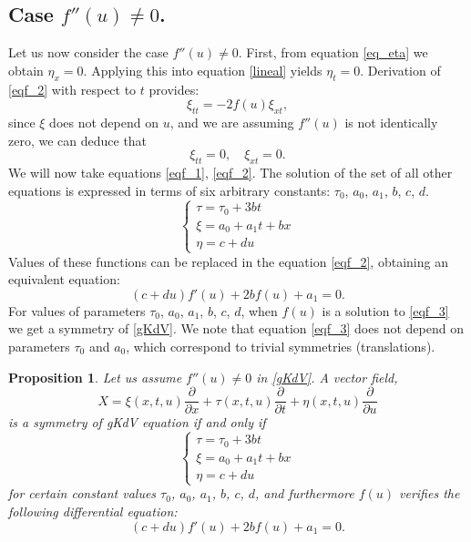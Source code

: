 \documentclass[
11pt,%
tightenlines,%
twoside,%
onecolumn,%
nofloats,%
nobibnotes,%
nofootinbib,%
superscriptaddress,%
noshowpacs,%
centertags]%
{revtex4}
\newtheorem{proposition}{Proposition}
\begin{document}
\subsection{Case $f''(u)\neq 0$.}

Let us now consider the case $f''(u) \neq 0$. First, from equation \eqref{eq_eta}
we obtain $\eta_x = 0$. Applying this into equation \eqref{lineal} yields $\eta_t = 0$. Derivation of \eqref{eqf_2} with respect to $t$ provides:
\begin{equation}
\xi_{tt} = -2f(u)\xi_{xt},
\end{equation}
since $\xi$ does not depend on $u$, and we are assuming $f''(u)$ is not identically zero, we can deduce that
\begin{equation}
\xi_{tt}= 0, \quad \xi_{xt} = 0.
\end{equation}
We will now take equations  \eqref{eqf_1}, \eqref{eqf_2}. The solution of the set of all other equations is expressed in terms of six arbitrary constants: $\tau_0$, $a_0$, $a_1$, $b$, $c$, $d$. 
\begin{equation}
\begin{cases}
\tau = \tau_0 + 3bt \\
\xi = a_0 + a_1t + bx \\
\eta = c + du
\end{cases}
\end{equation}
Values of these functions can be replaced in the equation  \eqref{eqf_2}, obtaining an equivalent equation:
\begin{equation}\label{eqf_3}
(c+du)f'(u) + 2bf(u) + a_1 = 0.
\end{equation}
For values of parameters $\tau_0$, $a_0$, $a_1$, $b$, $c$, $d$, when $f(u)$ is a solution to \eqref{eqf_3} we get a symmetry of \eqref{gKdV}. 
We note that equation \eqref{eqf_3} does not depend on parameters $\tau_0$ and $a_0$, which correspond to trivial symmetries (translations).

\begin{proposition}\label{proposition1}
Let us assume $f''(u) \neq 0$ in \eqref{gKdV}. A vector field,
$$X = \xi(x,t,u) \frac{\partial}{\partial x} + \tau(x,t,u)\frac{\partial}{\partial t} + \eta(x,t,u)\frac{\partial}{\partial u}$$
is a symmetry of gKdV equation if and only if  
$$
\begin{cases}
\tau = \tau_0 + 3bt \\
\xi = a_0 + a_1t + bx \\
\eta = c + du
\end{cases}
$$
for certain  constant  values $\tau_0$, $a_0$, $a_1$, $b$, $c$, $d$, and furthermore $f(u)$ verifies the following differential equation:
$$
(c+du)f'(u) + 2bf(u) + a_1 = 0.
$$
\end{proposition}
\end{document}
